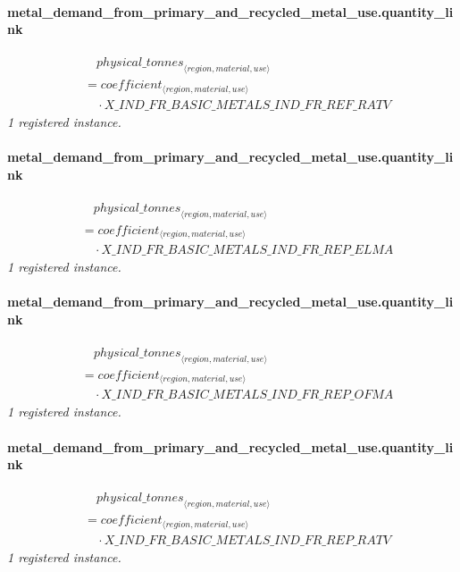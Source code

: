 \documentclass[11pt]{article}
\begin{document}
\paragraph{metal\_demand\_from\_primary\_and\_recycled\_metal\_use.quantity\_link}
\begin{align*}
&\quad {physical\_tonnes}_{\langle region, material, use\rangle}\\
&= coefficient_{\langle region, material, use\rangle}\\
&\quad {}\cdot X\_IND\_FR\_BASIC\_METALS\_IND\_FR\_REF\_RATV
\end{align*}
\noindent\emph{1 registered instance.}\par
\paragraph{metal\_demand\_from\_primary\_and\_recycled\_metal\_use.quantity\_link}
\begin{align*}
&\quad {physical\_tonnes}_{\langle region, material, use\rangle}\\
&= coefficient_{\langle region, material, use\rangle}\\
&\quad {}\cdot X\_IND\_FR\_BASIC\_METALS\_IND\_FR\_REP\_ELMA
\end{align*}
\noindent\emph{1 registered instance.}\par
\paragraph{metal\_demand\_from\_primary\_and\_recycled\_metal\_use.quantity\_link}
\begin{align*}
&\quad {physical\_tonnes}_{\langle region, material, use\rangle}\\
&= coefficient_{\langle region, material, use\rangle}\\
&\quad {}\cdot X\_IND\_FR\_BASIC\_METALS\_IND\_FR\_REP\_OFMA
\end{align*}
\noindent\emph{1 registered instance.}\par
\paragraph{metal\_demand\_from\_primary\_and\_recycled\_metal\_use.quantity\_link}
\begin{align*}
&\quad {physical\_tonnes}_{\langle region, material, use\rangle}\\
&= coefficient_{\langle region, material, use\rangle}\\
&\quad {}\cdot X\_IND\_FR\_BASIC\_METALS\_IND\_FR\_REP\_RATV
\end{align*}
\noindent\emph{1 registered instance.}\par
\end{document}

